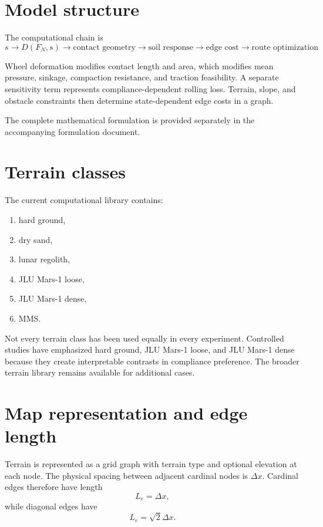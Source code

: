 \documentclass[11pt]{article}
\begin{document}
\section{Model structure}

The computational chain is
\begin{equation}
\boxed{
s
\rightarrow D(F_N,s)
\rightarrow \text{contact geometry}
\rightarrow \text{soil response}
\rightarrow \text{edge cost}
\rightarrow \text{route optimization}
}.
\end{equation}

Wheel deformation modifies contact length and area, which modifies mean pressure, sinkage, compaction resistance, and traction feasibility. A separate sensitivity term represents compliance-dependent rolling loss. Terrain, slope, and obstacle constraints then determine state-dependent edge costs in a graph.

The complete mathematical formulation is provided separately in the accompanying formulation document.

\section{Terrain classes}

The current computational library contains:
\begin{enumerate}[label=(\arabic*)]
\item hard ground,
\item dry sand,
\item lunar regolith,
\item JLU Mars-1 loose,
\item JLU Mars-1 dense,
\item MMS.
\end{enumerate}

Not every terrain class has been used equally in every experiment. Controlled studies have emphasized hard ground, JLU Mars-1 loose, and JLU Mars-1 dense because they create interpretable contrasts in compliance preference. The broader terrain library remains available for additional cases.

\section{Map representation and edge length}

Terrain is represented as a grid graph with terrain type and optional elevation at each node. The physical spacing between adjacent cardinal nodes is $\Delta x$. Cardinal edges therefore have length
\begin{equation}
L_e=\Delta x,
\end{equation}
while diagonal edges have
\begin{equation}
L_e=\sqrt{2}\Delta x.
\end{equation}
\end{document}

